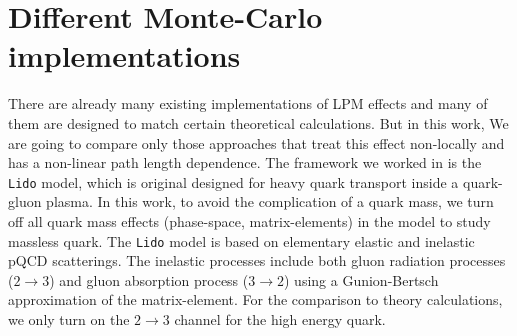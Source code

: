 \documentclass[aps, prc, reprint, amsmath, groupedaddress, nofootinbib]{revtex4-1}
\begin{document}
\section{Different Monte-Carlo implementations}\label{section:MC}
There are already many existing implementations of LPM effects and many of them are designed to match certain theoretical calculations. 
But in this work, We are going to compare only those approaches that treat this effect non-locally and has a non-linear path length dependence.
The framework we worked in is the {\tt Lido} model, which is original designed for heavy quark transport inside a quark-gluon plasma. 
In this work, to avoid the complication of a quark mass, we turn off all quark mass effects (phase-space, matrix-elements) in the model to study massless quark.
The {\tt Lido} model is based on elementary elastic and inelastic pQCD scatterings. 
The inelastic processes include both gluon radiation processes ($2\rightarrow 3$) and gluon absorption process ($3\rightarrow 2$) using a Gunion-Bertsch approximation of the matrix-element.
For the comparison to theory calculations, we only turn on the $2\rightarrow 3$ channel for the high energy quark.
\end{document}
